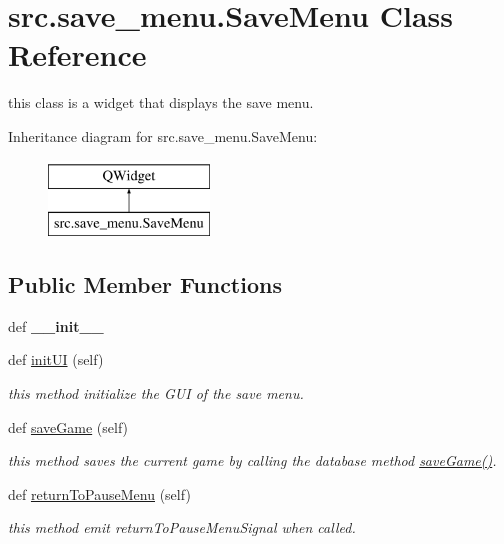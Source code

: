 \hypertarget{classsrc_1_1save__menu_1_1_save_menu}{}\section{src.\+save\+\_\+menu.\+Save\+Menu Class Reference}
\label{classsrc_1_1save__menu_1_1_save_menu}


this class is a widget that displays the save menu.  


Inheritance diagram for src.\+save\+\_\+menu.\+Save\+Menu\+:\begin{figure}[H]
\begin{center}
\leavevmode
\includegraphics[height=2.000000cm]{classsrc_1_1save__menu_1_1_save_menu}
\end{center}
\end{figure}
\subsection*{Public Member Functions}
\begin{DoxyCompactItemize}
\item 
\hypertarget{classsrc_1_1save__menu_1_1_save_menu_aec50d1d33e455ba8ea30063059ba3270}{}def {\bfseries \+\_\+\+\_\+init\+\_\+\+\_\+}\label{classsrc_1_1save__menu_1_1_save_menu_aec50d1d33e455ba8ea30063059ba3270}

\item 
def \hyperlink{classsrc_1_1save__menu_1_1_save_menu_a69135ce0e32c0ec25e23f4cea0a0eae8}{init\+U\+I} (self)
\begin{DoxyCompactList}\small\item\em this method initialize the G\+U\+I of the save menu. \end{DoxyCompactList}\item 
def \hyperlink{classsrc_1_1save__menu_1_1_save_menu_a318487ca9ed34963dd572faa1ce09c56}{save\+Game} (self)
\begin{DoxyCompactList}\small\item\em this method saves the current game by calling the database method \hyperlink{classsrc_1_1save__menu_1_1_save_menu_a318487ca9ed34963dd572faa1ce09c56}{save\+Game()}. \end{DoxyCompactList}\item 
def \hyperlink{classsrc_1_1save__menu_1_1_save_menu_a91e3ce3f4563456db3102294459a8c43}{return\+To\+Pause\+Menu} (self)
\begin{DoxyCompactList}\small\item\em this method emit return\+To\+Pause\+Menu\+Signal when called. \end{DoxyCompactList}\end{DoxyCompactItemize}
